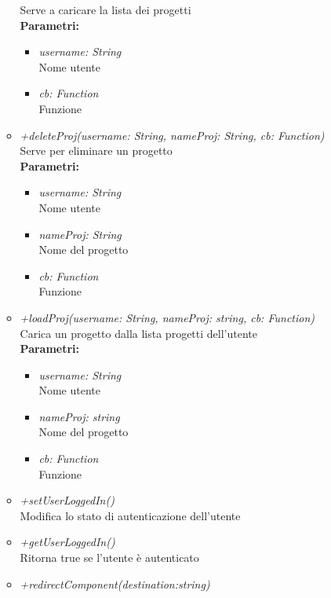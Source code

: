 \begin{itemize}
\begin{itemize}
    		Serve a caricare la lista dei progetti\\
    		\textbf{Parametri:}
    		\begin{itemize}
    			\item \emph{username: String}\\
    			Nome utente
    			\item \emph{cb: Function}\\
    			Funzione
    		\end{itemize}
    		\item \emph{+deleteProj(username: String, nameProj: String, cb: Function)}\\
    		Serve per eliminare un progetto\\
    		\textbf{Parametri:}
    		\begin{itemize}
    			\item \emph{username: String}\\
    			Nome utente
    			\item \emph{nameProj: String}\\
    			Nome del progetto
    			\item \emph{cb: Function}\\
    			Funzione
    		\end{itemize}
    		\item \emph{+loadProj(username: String, nameProj: string, cb: Function)}\\
    		Carica un progetto dalla lista progetti dell'utente\\
    		\textbf{Parametri:}
    		\begin{itemize}
    			\item \emph{username: String}\\
    			Nome utente
    			\item \emph{nameProj: string}\\
    			Nome del progetto
    			\item \emph{cb: Function}\\
    			Funzione
    		\end{itemize}
    		\item \emph{+setUserLoggedIn()}\\
    		Modifica lo stato di autenticazione dell'utente
    		\item \emph{+getUserLoggedIn()}\\
    		Ritorna true se l'utente è autenticato
    		\item \emph{+redirectComponent(destination:string)}\\

\end{itemize}
\end{itemize}
